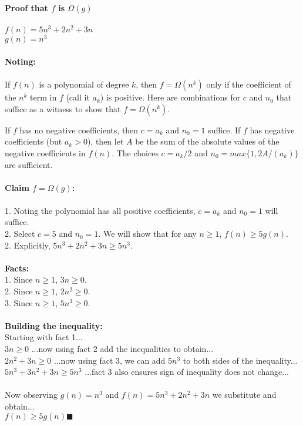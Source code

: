 \documentclass[OPONE]{example}
\begin{document}
\begin{list}{}{}
	\newpage 
	
	\textbf{Proof that $f$ is $\Omega(g)$} \\ 
	\\
	$f(n) = 5n^{3} + 2n^{2} + 3n$ \\
	$g(n) = n^{3}$ \\
	\\
	\textbf{Noting: }\\
	\\
	If $f(n)$ is a polynomial of degree $k$, then $f = \Omega(n^{k})$ only if the coefficient of the $n^{k}$ term in $f$ (call it $a_{k}$) is positive. Here are combinations for $c$ and $n_{0}$ that suffice as a witness to show that $f = \Omega(n^{k})$.
	
	If $f$ has no negative coefficients, then $c = a_{k}$ and $n_{0} = 1$ suffice.
	If $f$ has negative coefficients (but $a_{k} > 0$), then let $A$ be the sum of the absolute values of the negative coefficients in $f(n)$. The choices $c = a_{k}/2$ and $n_{0} = max\{1, 2A/(a_{k})\}$ are sufficient. \\
	\\
	\textbf{Claim $f = \Omega(g)$: }\\
	\\
	1. Noting the polynomial has all positive coefficients, $c = a_{k}$ and $n_{0} = 1$ will suffice. \\
	2. Select $c = 5$ and $n_{0} = 1$.  We will show that for any $n \geq 1$, $f(n) \geq 5g(n)$. \\
	2. Explicitly, $5n^{3} + 2n^{2} + 3n \geq 5n^{3}$.\\
	\\
	\textbf{Facts:} \\
	1. Since $n \geq 1$, $3n \geq 0$.\\
	2. Since $n \geq 1$, $2n^{2} \geq 0$.\\
	3. Since $n \geq 1$, $5n^{3} \geq 0$.\\
	\\
	\textbf{Building the inequality:} \\
	Starting with fact 1...\\
	$3n \geq 0$ \hspace{1.43 in} ...now using fact 2 add the inequalities to obtain...\\
	$2n^{2} + 3n \geq 0$ \hspace{1.1 in} ...now using fact 3, we can add $5n^{3}$ to both sides of the inequality...\\
	$5n^{3} + 3n^{2} + 3n \geq 5n^{3}$ \hspace{0.53 in} ...fact 3 also ensures sign of inequality does not change...\\
	\\
	Now observing $g(n) = n^{3}$  and $f(n) = 5n^{3} + 2n^{2} + 3n$ we substitute and obtain... \\
	$f(n) \geq 5g(n)  \blacksquare$ \\
	\\


\end{list}
\end{document}
